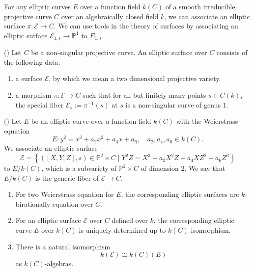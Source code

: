 \documentclass[main]{subfiles}
\begin{document}
For any elliptic curves $E$ over a function field $k(C)$ of a smooth irreducible projective curve $C$ over an algebraically closed field $k$, we can associate an elliptic surface $\pi: \mathcal{E} \to C$.
We can use tools in the theory of surfaces by associating an elliptic surface $\mathcal{E}_{1,s} \to \mathbb{P}^1$ to $E_{1,s}$.

\begin{dfn}{(\cite[III\S 3 Definition]{ref:advancedaec})}
    Let $C$ be a non-singular projective curve.
    An elliptic surface over $C$ consists of the following data:
    \begin{enumerate}[label=(\roman*)]
        \item a surface $\mathcal{E}$, by which we mean a two dimensional projective variety.
        \item a morphism $\pi: \mathcal{E} \to C$ such that for all but finitely many points $s\in C(k)$, the special fiber $\mathcal{E}_s:=\pi^{-1}(s)$ at $s$ is a non-singular curve of genus $1$.
    \end{enumerate}
\end{dfn}
\begin{prop}{(\cite[Proposition III.3.8.]{ref:advancedaec})}
    Let $E$ be an elliptic curve over a function field $k(C)$ with the Weierstrass equation
    \begin{equation*}
        E: y^{2} = x^{3} + a_2 x^{2} + a_4 x + a_6, \quad a_2, a_4, a_6 \in k(C).
    \end{equation*}
    We associate an elliptic surface
    \begin{equation*}
        \mathcal{E} = \left\{
            ([X,Y,Z], s)\in \mathbb{P}^2 \times C \mid Y^{2}Z = X^3 + a_2 X^2 Z + a_4 X Z^2 + a_6 Z^3
         \right\}
    \end{equation*}
    to $E/k(C)$, which is a subvariety of $\mathbb{P}^2 \times C$ of dimension $2$.
    We say that $E/k(C)$ is the generic fiber of $\mathcal{E} \to C$.
    \begin{enumerate}[label=(\alph*)]
        \item For two Weierstrass equation for $E$, the corresponding elliptic surfaces are $k$-birationally equation over $C$.
        \item For an elliptic surface $\mathcal{E}$ over $C$ defined over $k$, the corresponding elliptic curve $E$ over $k(C)$ is uniquely determined up to $k(C)$-isomorphism.
        \item There is a natural isomorphism
            \begin{equation*}
                k(\mathcal{E}) \cong k(C)(E)
            \end{equation*}
            as $k(C)$-algebras.
    \end{enumerate}
\end{prop}
\end{document}
